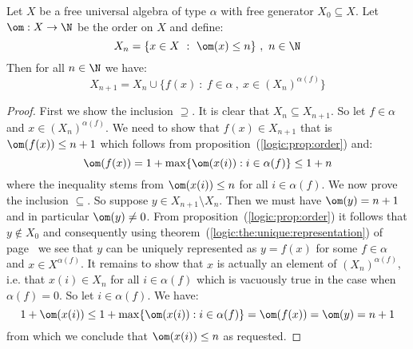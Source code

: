 \begin{prop}\label{logic:prop:order:structure}
Let $X$ be a free universal algebra of type $\alpha$ with free
generator $X_{0}\subseteq X$. Let $\om:X\to\N$ be the order on $X$
and define:
    \[
    X_{n}=\{x\in X\ : \ \om(x)\leq n\}\ ,\ n\in\N
    \]
Then for all $n\in\N$ we have:
    \[
    X_{n+1}=X_{n}\cup\{f(x)\ :\ f\in\alpha\ ,\
    x\in(X_{n})^{\alpha(f)}\}
    \]
\end{prop}
\begin{proof}
First we show the inclusion $\supseteq$. It is clear that
$X_{n}\subseteq X_{n+1}$. So let $f\in\alpha$ and
$x\in(X_{n})^{\alpha(f)}$. We need to show that $f(x)\in X_{n+1}$
that is $\om(f(x))\leq n+1$ which follows from
proposition~(\ref{logic:prop:order}) and:
    \[
    \om(f(x))=1 + \max\{\om(x(i)):i\in\alpha(f)\}\leq 1 + n
    \]
where the inequality stems from $\om(x(i))\leq n$ for all
$i\in\alpha(f)$. We now prove the inclusion $\subseteq$. So suppose
$y\in X_{n+1}\setminus X_{n}$. Then we must have $\om(y)=n+1$ and in
particular $\om(y)\neq 0$. From proposition~(\ref{logic:prop:order})
it follows that $y\not\in X_{0}$ and consequently using
theorem~(\ref{logic:the:unique:representation}) of
page~\pageref{logic:the:unique:representation} we see that $y$ can
be uniquely represented as $y=f(x)$ for some $f\in\alpha$ and $x\in
X^{\alpha(f)}$. It remains to show that $x$ is actually an element
of $(X_{n})^{\alpha(f)}$, i.e. that $x(i)\in X_{n}$ for all
$i\in\alpha(f)$ which is vacuously true in the case when
$\alpha(f)=0$. So let $i\in\alpha(f)$. We have:
    \[
    1 +\om(x(i))\leq 1 +
    \max\{\om(x(i)):i\in\alpha(f)\}=\om(f(x))=\om(y)=n+1
    \]
from which we conclude that $\om(x(i))\leq n$ as requested.
\end{proof}
